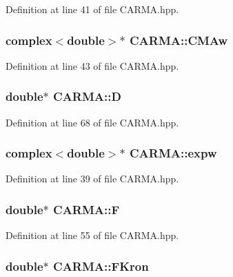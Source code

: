 Definition at line 41 of file C\-A\-R\-M\-A.\-hpp.

\hypertarget{class_c_a_r_m_a_a796f3af91b03b11b3d08f3ce668de258}{
\subsubsection[{C\-M\-Aw}]{\setlength{\rightskip}{0pt plus 5cm}complex$<$double$>$$\ast$ C\-A\-R\-M\-A\-::\-C\-M\-Aw}}\label{class_c_a_r_m_a_a796f3af91b03b11b3d08f3ce668de258}


Definition at line 43 of file C\-A\-R\-M\-A.\-hpp.

\hypertarget{class_c_a_r_m_a_a95cd26896bd2a97497be37295e039dc8}{
\subsubsection[{D}]{\setlength{\rightskip}{0pt plus 5cm}double$\ast$ C\-A\-R\-M\-A\-::\-D}}\label{class_c_a_r_m_a_a95cd26896bd2a97497be37295e039dc8}


Definition at line 68 of file C\-A\-R\-M\-A.\-hpp.

\hypertarget{class_c_a_r_m_a_a53bc76be0e75d214cb9bc18bdf07cab9}{
\subsubsection[{expw}]{\setlength{\rightskip}{0pt plus 5cm}complex$<$double$>$$\ast$ C\-A\-R\-M\-A\-::expw}}\label{class_c_a_r_m_a_a53bc76be0e75d214cb9bc18bdf07cab9}


Definition at line 39 of file C\-A\-R\-M\-A.\-hpp.

\hypertarget{class_c_a_r_m_a_aad97cb3334f43c80bfb2aabb1b22bb52}{
\subsubsection[{F}]{\setlength{\rightskip}{0pt plus 5cm}double$\ast$ C\-A\-R\-M\-A\-::\-F}}\label{class_c_a_r_m_a_aad97cb3334f43c80bfb2aabb1b22bb52}


Definition at line 55 of file C\-A\-R\-M\-A.\-hpp.

\hypertarget{class_c_a_r_m_a_a45b3f6243c0ebd0dbe4b3b2b6c41dc42}{
\subsubsection[{F\-Kron}]{\setlength{\rightskip}{0pt plus 5cm}double$\ast$ C\-A\-R\-M\-A\-::\-F\-Kron}}\label{class_c_a_r_m_a_a45b3f6243c0ebd0dbe4b3b2b6c41dc42}


